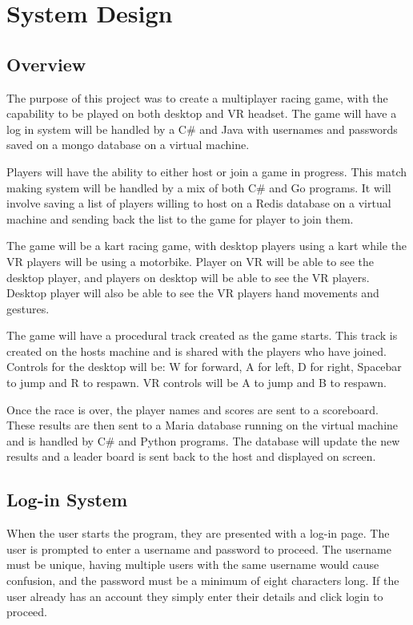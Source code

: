 
\chapter{System Design}
\section{Overview}
The purpose of this project was to create a multiplayer racing game, with the capability to be played on both desktop and VR headset. The game will have a log in system will be handled by a C# and Java with usernames and passwords saved on a mongo database on a virtual machine.
\newline

Players will have the ability to either host or join a game in progress. This match making system will be handled by a mix of both C# and Go programs. It will involve saving a list of players willing to host on a Redis database on a virtual machine and sending back the list to the game for player to join them.
\newline

The game will be a kart racing game, with desktop players using a kart while the VR players will be using a motorbike. Player on VR will be able to see the desktop player, and players on desktop will be able to see the VR players. Desktop player will also be able to see the VR players hand movements and gestures.
\newline

The game will have a procedural track created as the game starts. This track is created on the hosts machine and is shared with the players who have joined. Controls for the desktop will be:
W for forward, A for left, D for right, Spacebar to jump and R to respawn.
VR controls will be A to jump and B to respawn.
\newline

Once the race is over, the player names and scores are sent to a scoreboard. These results are then sent to a Maria database running on the virtual machine and is handled by C\# and Python programs. The database will update the new results and a leader board is sent back to the host and displayed on screen.

\section{Log-in System}
When the user starts the program, they are presented with a log-in page. The user is prompted to enter a username and password to proceed. The username must be unique, having multiple users with the same username would cause confusion, and the password must be a minimum of eight characters long. If the user already has an account they simply enter their details and click login to proceed.
\newline 

